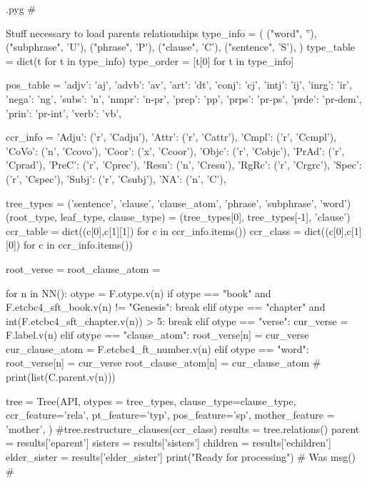 \documentclass{report}
\makeatletter
\newenvironment{python}{%
  \VerbatimEnvironment
  \minted@resetoptions
  \setkeys{minted@opt}{}
      \begin{VerbatimOut}{\jobname.pyg}}
{%
      \end{VerbatimOut}
      \minted@pygmentize{python}
      \DeleteFile{\jobname.pyg}}
\makeatother
\begin{document}
\begin{python}
#{{{ Stuff necessary to load parents relationships
type_info = (
    ("word", ''),
    ("subphrase", 'U'),
    ("phrase", 'P'),
    ("clause", 'C'),
    ("sentence", 'S'),
)
type_table = dict(t for t in type_info)
type_order = [t[0] for t in type_info]

pos_table = {
    'adjv': 'aj',
    'advb': 'av',
    'art': 'dt',
    'conj': 'cj',
    'intj': 'ij',
    'inrg': 'ir',
    'nega': 'ng',
    'subs': 'n',
    'nmpr': 'n-pr',
    'prep': 'pp',
    'prps': 'pr-ps',
    'prde': 'pr-dem',
    'prin': 'pr-int',
    'verb': 'vb',
}

ccr_info = {
    'Adju': ('r', 'Cadju'),
    'Attr': ('r', 'Cattr'),
    'Cmpl': ('r', 'Ccmpl'),
    'CoVo': ('n', 'Ccovo'),
    'Coor': ('x', 'Ccoor'),
    'Objc': ('r', 'Cobjc'),
    'PrAd': ('r', 'Cprad'),
    'PreC': ('r', 'Cprec'),
    'Resu': ('n', 'Cresu'),
    'RgRc': ('r', 'Crgrc'),
    'Spec': ('r', 'Cspec'),
    'Subj': ('r', 'Csubj'),
    'NA':   ('n', 'C'),
}

tree_types = ('sentence', 'clause', 'clause_atom', 'phrase', 'subphrase', 'word')
(root_type, leaf_type, clause_type) = (tree_types[0], tree_types[-1], 'clause')
ccr_table = dict((c[0],c[1][1]) for c in ccr_info.items())
ccr_class = dict((c[0],c[1][0]) for c in ccr_info.items())

root_verse = {}
root_clause_atom = {}

for n in NN():
    otype = F.otype.v(n)
    if otype == "book" and F.etcbc4_sft_book.v(n) != "Genesis":
        break
    elif otype == "chapter" and int(F.etcbc4_sft_chapter.v(n)) > 5:
        break
    elif otype == "verse": cur_verse = F.label.v(n)
    elif otype == "clause_atom":
        root_verse[n] = cur_verse
        cur_clause_atom = F.etcbc4_ft_number.v(n)
    elif otype == "word":
        root_verse[n] = cur_verse
        root_clause_atom[n] = cur_clause_atom
#        print(list(C.parent.v(n)))

tree = Tree(API, otypes = tree_types,
     clause_type=clause_type,
     ccr_feature='rela',
     pt_feature='typ',
     pos_feature='sp',
     mother_feature = 'mother',
     )
#tree.restructure_clauses(ccr_class)
results = tree.relations()
parent = results['eparent']
sisters = results['sisters']
children = results['echildren']
elder_sister = results['elder_sister']
print("Ready for processing") # Was msg()
#}}}
\end{python}
\end{document}
